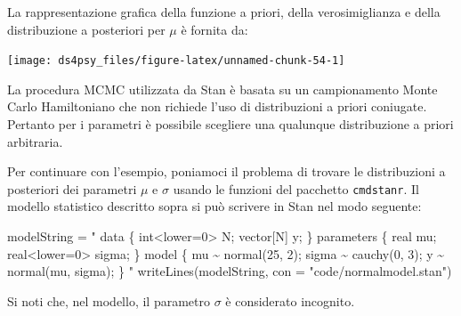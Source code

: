 \documentclass[
  11pt,
]{krantz}
\makeatletter
\newenvironment{Shaded}{\begin{snugshade}}{\end{snugshade}}
\newcommand{\AttributeTok}[1]{\textcolor[rgb]{0.61,0.61,0.61}{#1}}
\newcommand{\DecValTok}[1]{\textcolor[rgb]{0.06,0.06,0.06}{#1}}
\newcommand{\FunctionTok}[1]{\textcolor[rgb]{0,0,0}{#1}}
\newcommand{\NormalTok}[1]{#1}
\newcommand{\OtherTok}[1]{\textcolor[rgb]{0.37,0.37,0.37}{#1}}
\newcommand{\SpecialCharTok}[1]{\textcolor[rgb]{0,0,0}{#1}}
\newcommand{\StringTok}[1]{\textcolor[rgb]{0.5,0.5,0.5}{#1}}
\newenvironment{kframe}{%
\medskip{}
\setlength{\fboxsep}{.8em}
 \def\at@end@of@kframe{}%
 \ifinner\ifhmode%
  \def\at@end@of@kframe{\end{minipage}}%
  \begin{minipage}{\columnwidth}%
 \fi\fi%
 \def\FrameCommand##1{\hskip\@totalleftmargin \hskip-\fboxsep
 \colorbox{shadecolor}{##1}\hskip-\fboxsep
     \hskip-\linewidth \hskip-\@totalleftmargin \hskip\columnwidth}%
 \MakeFramed {\advance\hsize-\width
   \@totalleftmargin\z@ \linewidth\hsize
   \@setminipage}}%
 {\par\unskip\endMakeFramed%
 \at@end@of@kframe}
\renewenvironment{Shaded}{\begin{kframe}}{\end{kframe}}
\theoremstyle{definition}
\theoremstyle{definition}
\theoremstyle{definition}
\theoremstyle{definition}
\theoremstyle{remark}
\makeatother
\begin{document}
La rappresentazione grafica della funzione a priori, della verosimiglianza e della distribuzione a posteriori per \(\mu\) è fornita da:

\begin{Shaded}
\end{Shaded}

\begin{center}\texttt{[image: ds4psy\_files/figure-latex/unnamed-chunk-54-1]} \end{center}

La procedura MCMC utilizzata da Stan è basata su un campionamento Monte Carlo Hamiltoniano che non richiede l'uso di distribuzioni a priori coniugate. Pertanto per i parametri è possibile scegliere una qualunque distribuzione a priori arbitraria.

Per continuare con l'esempio, poniamoci il problema di trovare le distribuzioni a posteriori dei parametri \(\mu\) e \(\sigma\) usando le funzioni del pacchetto \texttt{cmdstanr}. Il modello statistico descritto sopra si può scrivere in Stan nel modo seguente:

\begin{Shaded}
\begin{Highlighting}[]
\NormalTok{modelString }\OtherTok{=} \StringTok{"}
\StringTok{data \{}
\StringTok{  int\textless{}lower=0\textgreater{} N;}
\StringTok{  vector[N] y;}
\StringTok{\}}
\StringTok{parameters \{}
\StringTok{  real mu;}
\StringTok{  real\textless{}lower=0\textgreater{} sigma;}
\StringTok{\}}
\StringTok{model \{}
\StringTok{  mu \textasciitilde{} normal(25, 2);}
\StringTok{  sigma \textasciitilde{} cauchy(0, 3);}
\StringTok{  y \textasciitilde{} normal(mu, sigma);}
\StringTok{\}}
\StringTok{"}
\FunctionTok{writeLines}\NormalTok{(modelString, }\AttributeTok{con =} \StringTok{"code/normalmodel.stan"}\NormalTok{)}
\end{Highlighting}
\end{Shaded}

Si noti che, nel modello, il parametro \(\sigma\) è considerato incognito.
\end{document}
